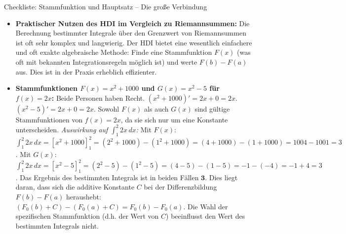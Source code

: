 \begin{loesungsumgebung}{Checkliste: Stammfunktion und Hauptsatz – Die große Verbindung}
\begin{enumerate}[label=(\alph*)]
\begin{itemize}
        \item \textbf{Praktischer Nutzen des HDI im Vergleich zu Riemannsummen:}
        Die Berechnung bestimmter Integrale über den Grenzwert von Riemannsummen ist oft sehr komplex und langwierig. Der HDI bietet eine wesentlich einfachere und oft exakte algebraische Methode: Finde eine Stammfunktion $F(x)$ (was oft mit bekannten Integrationsregeln möglich ist) und werte $F(b)-F(a)$ aus. Dies ist in der Praxis erheblich effizienter.

        \item \textbf{Stammfunktionen $F(x)=x^2+1000$ und $G(x)=x^2-5$ für $f(x)=2x$:}
        Beide Personen haben Recht.
        $(x^2+1000)' = 2x + 0 = 2x$.
        $(x^2-5)' = 2x + 0 = 2x$.
        Sowohl $F(x)$ als auch $G(x)$ sind gültige Stammfunktionen von $f(x)=2x$, da sie sich nur um eine Konstante unterscheiden.
        \textit{Auswirkung auf $\int_1^2 2x \,dx$:}
        Mit $F(x)$: $\int_1^2 2x \,dx = [x^2+1000]_1^2 = (2^2+1000) - (1^2+1000) = (4+1000) - (1+1000) = 1004 - 1001 = 3$.
        Mit $G(x)$: $\int_1^2 2x \,dx = [x^2-5]_1^2 = (2^2-5) - (1^2-5) = (4-5) - (1-5) = -1 - (-4) = -1+4 = 3$.
        Das Ergebnis des bestimmten Integrals ist in beiden Fällen $\mathbf{3}$. Dies liegt daran, dass sich die additive Konstante $C$ bei der Differenzbildung $F(b)-F(a)$ heraushebt: $(F_0(b)+C) - (F_0(a)+C) = F_0(b)-F_0(a)$. Die Wahl der spezifischen Stammfunktion (d.h. der Wert von $C$) beeinflusst den Wert des bestimmten Integrals nicht.
    \end{itemize}


\end{enumerate}
\end{loesungsumgebung}
